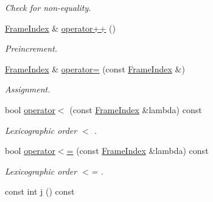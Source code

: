 \begin{CompactItemize}
\begin{CompactList}\small\item\em Check for non-equality. \item\end{CompactList}\item 
\hypertarget{classFrameTL_1_1FrameIndex_0c3a9a8031aba79b026358cad134bba4}{
\hyperlink{classFrameTL_1_1FrameIndex}{FrameIndex} \& \hyperlink{classFrameTL_1_1FrameIndex_0c3a9a8031aba79b026358cad134bba4}{operator++} ()}
\label{classFrameTL_1_1FrameIndex_0c3a9a8031aba79b026358cad134bba4}

\begin{CompactList}\small\item\em Preincrement. \item\end{CompactList}\item 
\hypertarget{classFrameTL_1_1FrameIndex_e1baf15f509eb26fbe749cf540fae97e}{
\hyperlink{classFrameTL_1_1FrameIndex}{FrameIndex} \& \hyperlink{classFrameTL_1_1FrameIndex_e1baf15f509eb26fbe749cf540fae97e}{operator=} (const \hyperlink{classFrameTL_1_1FrameIndex}{FrameIndex} \&)}
\label{classFrameTL_1_1FrameIndex_e1baf15f509eb26fbe749cf540fae97e}

\begin{CompactList}\small\item\em Assignment. \item\end{CompactList}\item 
\hypertarget{classFrameTL_1_1FrameIndex_0648b98586dfd6bd47bbde81066b7041}{
bool \hyperlink{classFrameTL_1_1FrameIndex_0648b98586dfd6bd47bbde81066b7041}{operator$<$} (const \hyperlink{classFrameTL_1_1FrameIndex}{FrameIndex} \&lambda) const }
\label{classFrameTL_1_1FrameIndex_0648b98586dfd6bd47bbde81066b7041}

\begin{CompactList}\small\item\em Lexicographic order $<$ . \item\end{CompactList}\item 
\hypertarget{classFrameTL_1_1FrameIndex_f23c073b37fffd66e1cbc235ef37e8bb}{
bool \hyperlink{classFrameTL_1_1FrameIndex_f23c073b37fffd66e1cbc235ef37e8bb}{operator$<$=} (const \hyperlink{classFrameTL_1_1FrameIndex}{FrameIndex} \&lambda) const }
\label{classFrameTL_1_1FrameIndex_f23c073b37fffd66e1cbc235ef37e8bb}

\begin{CompactList}\small\item\em Lexicographic order $<$= . \item\end{CompactList}\item 
\hypertarget{classFrameTL_1_1FrameIndex_464efdf0807754c1899b10a142039998}{
const int \hyperlink{classFrameTL_1_1FrameIndex_464efdf0807754c1899b10a142039998}{j} () const }
\label{classFrameTL_1_1FrameIndex_464efdf0807754c1899b10a142039998}


\end{CompactItemize}
